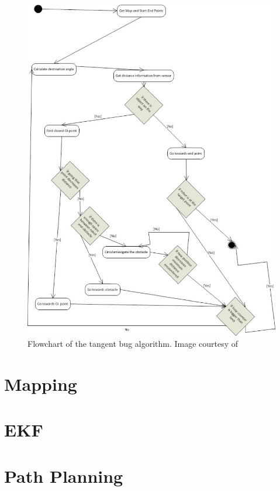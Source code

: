 \begin{figure}[H]
\includegraphics[width=\textwidth]{Figures/tangent_bug_diagram.jpg}
\centering
\caption{Flowchart of the tangent bug algorithm. Image courtesy of \cite{tangent_bug}}
\label{figure:infinite_corridor}
\end{figure}

\section{Mapping}
\section{EKF}
\section{Path Planning}

